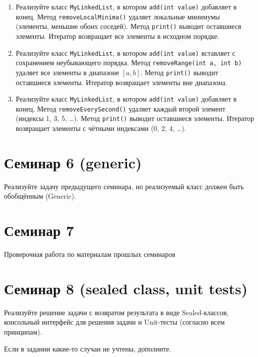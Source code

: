 \documentclass[12pt]{article}
\begin{document}
\begin{enumerate}
\item Реализуйте класс \texttt{MyLinkedList}, в котором \texttt{add(int value)} добавляет в конец. Метод \texttt{removeLocalMinima()} удаляет локальные минимумы (элементы, меньшие обоих соседей). Метод \texttt{print()} выводит оставшиеся элементы. Итератор возвращает все элементы в исходном порядке.

\item Реализуйте класс \texttt{MyLinkedList}, в котором \texttt{add(int value)} вставляет с сохранением неубывающего порядка. Метод \texttt{removeRange(int a, int b)} удаляет все элементы в диапазоне $[a, b]$. Метод \texttt{print()} выводит оставшиеся элементы. Итератор возвращает элементы вне диапазона.

\item Реализуйте класс \texttt{MyLinkedList}, в котором \texttt{add(int value)} добавляет в конец. Метод \texttt{removeEverySecond()} удаляет каждый второй элемент (индексы 1, 3, 5, …). Метод \texttt{print()} выводит оставшиеся элементы. Итератор возвращает элементы с чётными индексами (0, 2, 4, …).
\end{enumerate}

\section{Семинар 6 (generic)}

Реализуйте задачу предыдущего семинара, но реализуемый класс должен быть обобщённым (Generic).

\section{Семинар 7}

Проверочная работа по материалам прошлых семинаров


\section{Семинар 8 (sealed class, unit tests)}

Реализуйте решение задачи с возвратом результата в виде Sealed-классов, консольный интерфейс
для решения задачи и Unit-тесты (согласно всем принципам).

Если в задании какие-то случаи не учтены, дополните.
\end{document}
